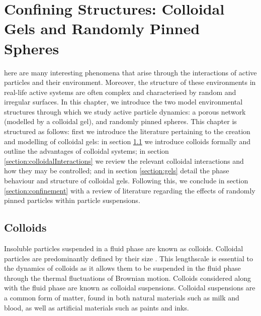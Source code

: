 %
\let\textcircled=\pgftextcircled
\chapter{Confining Structures: Colloidal Gels and Randomly Pinned Spheres}
\label{chap:colloids}

here are many interesting phenomena that arise through the interactions of active particles and their environment. Moreover, the structure of these environments in real-life active systems are often complex  and characterised by random and irregular surfaces. In this chapter, we introduce the two model environmental structures through which we study active particle dynamics: a porous network (modelled by a colloidal gel), and randomly pinned spheres. 
This chapter is structured as follows: first we introduce the literature pertaining to the creation and modelling of colloidal gels: in section \ref{section:colloids} we introduce colloids formally and outline the advantages of colloidal systems; in section \ref{section:colloidalInteractions} we review the relevant colloidal interactions and how they may be controlled; and in section \ref{section:gels} detail the phase behaviour and structure of colloidal gels. Following this, we conclude in section \ref{section:confinement} with a review of literature regarding the effects of randomly pinned particles within particle suspensions. 

\section{Colloids}
\label{section:colloids}

Insoluble particles suspended in a fluid phase are known as colloids. Colloidal particles are predominantly defined by their size \cite{lu2013}. This lengthscale is essential to the dynamics of colloids as it allows them to be suspended in the fluid phase through the thermal fluctuations of Brownian motion. Colloids  considered along with the fluid phase are known as colloidal suspensions. Colloidal suspensions are a common form of matter, found in both natural materials such as milk and blood, as well as artificial materials such as paints and inks.

